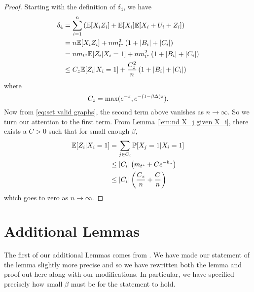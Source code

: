 	\begin{proof}
		Starting with the definition of $\delta_4$, we have
		\begin{align}
			\delta_4 &= \sum_{i = 1}^n \left(\mathbb{E}[X_i Z_i] + \mathbb{E}[X_i]\mathbb{E}[X_i + U_i + Z_i]\right)\\
				&= n \mathbb{E}[X_i Z_i] + n m_{t^*}^2 \left(1 + |B_i| + |C_i|\right)\\
				&= n m_{t^*} \mathbb{E}[Z_i | X_i = 1] + n m_{t^*}^2 \left(1 + |B_i| + |C_i|\right)\\
				&\leq C_z \mathbb{E}[Z_i | X_i = 1] + \frac{C_z^2}{n} \left(1 + |B_i| + |C_i|\right)
		\end{align}
		where 
		\begin{equation}
			C_z = \max(e^{-z}, e^{-(1 - \beta \Delta)z}).
		\end{equation}
		Now from \eqref{eq:set valid graphs}, the second term above vanishes as $n \rightarrow \infty$. So we turn our attention to the first term. From Lemma \ref{lem:nd X_j given X_i}, there exists a $C > 0$ such that for small enough $\beta$,
		\begin{align}
			\mathbb{E}[Z_i | X_i = 1] &= \sum_{j \in C_i} \mathbb{P}[X_j = 1 | X_i = 1]\\
				&\leq |C_i| \left(m_{t^*} + C e^{-b_n}\right)\\
				&\leq |C_i| \left(\frac{C_z}{n} + \frac{C}{n}\right)
		\end{align}
		which goes to zero as $n \rightarrow \infty$.
	\end{proof}

\section{Additional Lemmas}
\label{sec:additional lemmas nd}
	The first of our additional Lemmas comes from \cite[Lemma 3.1]{Lubetzky2015-po}. We have made our statement of the lemma slightly more precise and so we have rewritten both the lemma and proof out here along with our modifications. In particular, we have specified precisely how small $\beta$ must be for the statement to hold.

